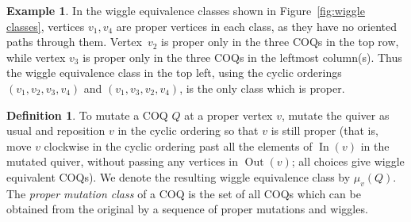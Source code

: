 \documentclass[11pt, letterpaper]{amsart}
\theoremstyle{definition}
\newtheorem{remark}[theorem]{Remark}
\newtheorem{example}[theorem]{Example}
\newtheorem{definition}[theorem]{Definition}
\numberwithin{equation}{section}
\def\In{{\operatorname{In}}}
\def\Out{{\operatorname{Out}}}
\begin{document}

\begin{example}
In the wiggle equivalence classes shown in Figure~\ref{fig:wiggle classes}, vertices $v_1, v_4$ are proper vertices in each class, as they have no oriented paths through them. 
Vertex~$v_2$ is proper only in the three COQs in the top row, while vertex $v_3$ is proper only in the three COQs in the leftmost column(s).
Thus the wiggle equivalence class in the top left, using the cyclic orderings $(v_1, v_2, v_3, v_4)$ and $(v_1, v_3, v_2, v_4)$, is the only class which is proper.
\end{example}

\begin{definition}  %
To mutate a COQ $Q$ at a proper vertex $v$, mutate the quiver as usual and reposition $v$ in the cyclic ordering so that $v$ is still proper (that is, move $v$ clockwise in the cyclic ordering past all the elements of $\In(v)$ in the mutated quiver, without passing any vertices in $\Out(v)$; 
all choices give wiggle equivalent COQs).
We denote the resulting wiggle equivalence class by $\mu_v(Q)$.
The \emph{proper mutation class} of a COQ is the set of all COQs which can be obtained from the original by a sequence of proper mutations and wiggles.
\end{definition}
\end{document}
